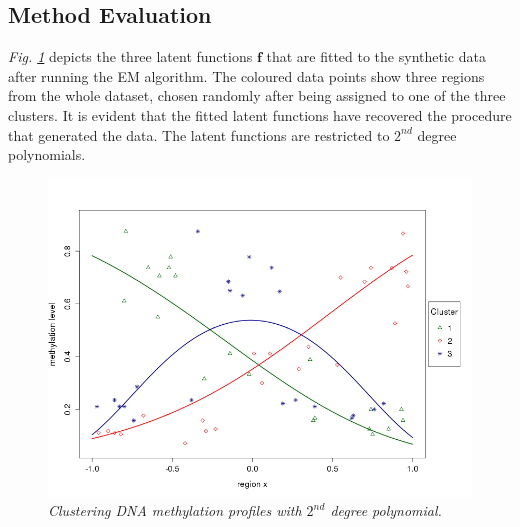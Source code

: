 \subsection{Method Evaluation} \label{meth-synth-method-subsect}
\emph{Fig. \ref{probit-2nd-pic}} depicts the three latent functions $\mathbf{f}$ that are fitted to the synthetic data after running the EM algorithm. The coloured data points show three regions from the whole dataset, chosen randomly after being assigned to one of the three clusters. It is evident that the fitted latent functions have recovered the procedure that generated the data. The latent functions are restricted to $2^{nd}$ degree polynomials.
\begin{figure}[!ht]
\begin{center}
 \includegraphics[scale = 0.40]{images/probit2nd.png}
\caption{\emph{Clustering DNA methylation profiles with $2^{nd}$ degree polynomial.}}
\label{probit-2nd-pic}
\end{center}
\end{figure}

